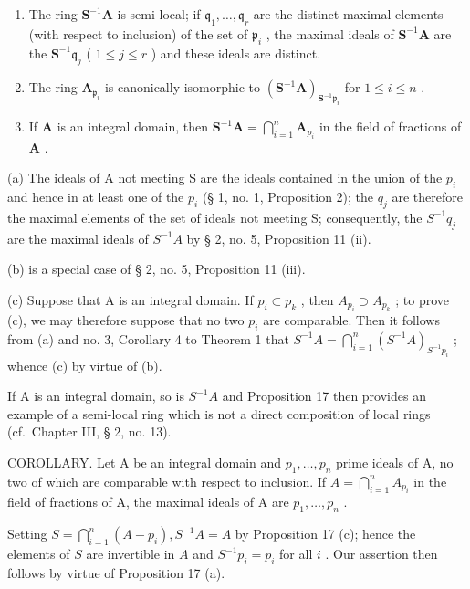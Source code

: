\begin{enumerate}
\def\labelenumi{(\alph{enumi})}
\item
  The ring \(\mathbf{S}^{-1}\mathbf{A}\) is semi-local; if \(\mathfrak{q}_1, \ldots, \mathfrak{q}_r\) are the distinct maximal elements (with respect to inclusion) of the set of \(\mathfrak{p}_i\) , the maximal ideals of \(\mathbf{S}^{-1}\mathbf{A}\) are the \(\mathbf{S}^{-1}\mathfrak{q}_j\) ( \(1 \leqslant j \leqslant r\) ) and these ideals are distinct.
\item
  The ring \(\mathbf{A}_{\mathfrak{p}_i}\) is canonically isomorphic to \((\mathbf{S}^{-1}\mathbf{A})_{\mathbf{S}^{-1}\mathfrak{p}_i}\) for \(1 \leqslant i \leqslant n\) .
\item
  If \(\mathbf{A}\) is an integral domain, then \(\mathbf{S}^{-1}\mathbf{A} = \bigcap_{i=1}^{n}\mathbf{A}_{p_i}\) in the field of fractions of \(\mathbf{A}\) .
\end{enumerate}

(a) The ideals of A not meeting S are the ideals contained in the union of the \(p_{i}\) and hence in at least one of the \(p_{i}\) (§ 1, no. 1, Proposition 2); the \(q_{j}\) are therefore the maximal elements of the set of ideals not meeting S; consequently, the \(S^{-1}q_{j}\) are the maximal ideals of \(S^{-1}A\) by § 2, no. 5, Proposition 11 (ii).

(b) is a special case of § 2, no. 5, Proposition 11 (iii).

(c) Suppose that A is an integral domain. If \(p_{i} \subset p_{k}\) , then \(A_{p_{i}} \supset A_{p_{k}}\) ; to prove (c), we may therefore suppose that no two \(p_{i}\) are comparable. Then it follows from (a) and no. 3, Corollary 4 to Theorem 1 that \(S^{-1}A = \bigcap_{i=1}^{n} (S^{-1}A)_{S^{-1}p_{i}}\) ; whence (c) by virtue of (b).

If A is an integral domain, so is \(S^{-1}A\) and Proposition 17 then provides an example of a semi-local ring which is not a direct composition of local rings (cf.~Chapter III, § 2, no. 13).

COROLLARY. Let A be an integral domain and \(p_{1}, \ldots, p_{n}\) prime ideals of A, no two of which are comparable with respect to inclusion. If \(A = \bigcap_{i=1}^{n} A_{p_{i}}\) in the field of fractions of A, the maximal ideals of A are \(p_{1}, \ldots, p_{n}\) .

Setting \(S = \bigcap_{i=1}^{n} (A - p_i), S^{-1} A = A\) by Proposition 17 (c); hence the elements of \(S\) are invertible in \(A\) and \(S^{-1} p_i = p_i\) for all \(i\) . Our assertion then follows by virtue of Proposition 17 (a).

